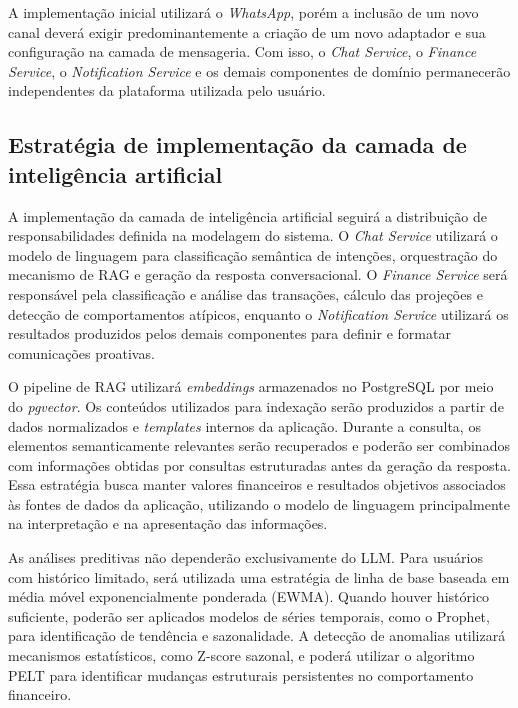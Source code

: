 A implementação inicial utilizará o \textit{WhatsApp}, porém a inclusão de um novo canal deverá exigir predominantemente a criação de um novo adaptador e sua configuração na camada de mensageria. Com isso, o \textit{Chat Service}, o \textit{Finance Service}, o \textit{Notification Service} e os demais componentes de domínio permanecerão independentes da plataforma utilizada pelo usuário.

\subsection{Estratégia de implementação da camada de inteligência artificial}

A implementação da camada de inteligência artificial seguirá a distribuição de responsabilidades definida na modelagem do sistema. O \textit{Chat Service} utilizará o modelo de linguagem para classificação semântica de intenções, orquestração do mecanismo de RAG e geração da resposta conversacional. O \textit{Finance Service} será responsável pela classificação e análise das transações, cálculo das projeções e detecção de comportamentos atípicos, enquanto o \textit{Notification Service} utilizará os resultados produzidos pelos demais componentes para definir e formatar comunicações proativas.

O pipeline de RAG utilizará \textit{embeddings} armazenados no PostgreSQL por meio do \textit{pgvector}. Os conteúdos utilizados para indexação serão produzidos a partir de dados normalizados e \textit{templates} internos da aplicação. Durante a consulta, os elementos semanticamente relevantes serão recuperados e poderão ser combinados com informações obtidas por consultas estruturadas antes da geração da resposta. Essa estratégia busca manter valores financeiros e resultados objetivos associados às fontes de dados da aplicação, utilizando o modelo de linguagem principalmente na interpretação e na apresentação das informações.

As análises preditivas não dependerão exclusivamente do LLM. Para usuários com histórico limitado, será utilizada uma estratégia de linha de base baseada em média móvel exponencialmente ponderada (EWMA). Quando houver histórico suficiente, poderão ser aplicados modelos de séries temporais, como o Prophet, para identificação de tendência e sazonalidade. A detecção de anomalias utilizará mecanismos estatísticos, como Z-score sazonal, e poderá utilizar o algoritmo PELT para identificar mudanças estruturais persistentes no comportamento financeiro.

